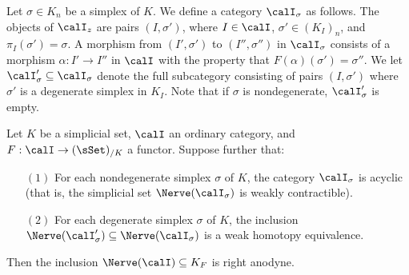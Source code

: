 \begin{notation}
Let $\sigma \in K_n$ be a simplex of $K$. We define a category
$\calI_{\sigma}$ as follows. The objects of $\calI_{z}$ are pairs $(I,
\sigma')$, where $I \in \calI$, $\sigma' \in (K_I)_n$, and $\pi_I(\sigma') = \sigma$. A
morphism from $(I',\sigma')$ to $(I'',\sigma'')$ in $\calI_{\sigma}$ consists of
a morphism $\alpha: I' \rightarrow I''$ in $\calI$ with the
property that $F(\alpha)(\sigma') = \sigma''$. We let $\calI'_{\sigma} \subseteq
\calI_{\sigma}$ denote the full subcategory consisting of pairs
$(I,\sigma')$ where $\sigma'$ is a degenerate simplex in $K_{I}$. Note that
if $\sigma$ is nondegenerate, $\calI'_{\sigma}$ is empty.
\end{notation}

\begin{proposition}\label{utl}
Let $K$ be a simplicial set, $\calI$ an ordinary category, and $F: \calI \rightarrow (\sSet)_{/K}$ a functor.
Suppose further that:
\begin{itemize}
\item[$(1)$] For each nondegenerate simplex $\sigma$ of $K$, the category
$\calI_{\sigma}$ is acyclic (that is, the simplicial set $\Nerve(\calI_{\sigma})$
is weakly contractible).

\item[$(2)$] For each degenerate simplex $\sigma$ of $K$, the inclusion $\Nerve
(\calI'_{\sigma}) \subseteq \Nerve(\calI_{\sigma})$ is a weak homotopy equivalence.
\end{itemize}

Then the inclusion $\Nerve(\calI) \subseteq K_{F}$ is right anodyne.
\end{proposition}

